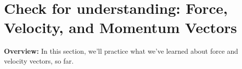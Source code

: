 \section[Check for understanding: More Vectors]{Check for understanding: Force, Velocity, and Momentum Vectors}
\label{act6.1.3b}

\begin{overview}

\textbf{Overview:} In this section, we'll practice what we've learned about force and velocity vectors, so far.

\end{overview}

\begin{fnt}
	
\end{fnt}

\WCD
\vspace{12pt}

\begin{fnt}
	
\end{fnt}

\WCD
\vspace{12pt}
\newpage

\begin{fnt}
	
\end{fnt}

\WCD
\vspace{12pt}

\begin{fnt}
	
\end{fnt}

\WCD